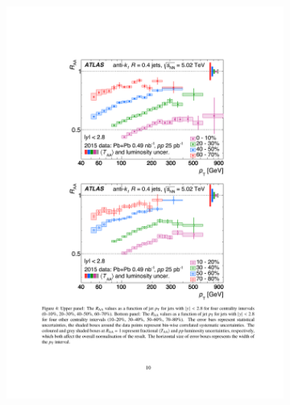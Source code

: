 \begin{figure}
\begin{subfigure}{.45\textwidth}
  \centering
\includegraphics[width=\textwidth]{figures/jetMeasurements/raa}
\caption{}
\label{fig:jetraa_atlas}
\end{subfigure} \qquad
\begin{subfigure}{.45\textwidth}
  \centering

\end{subfigure}
\end{figure}
